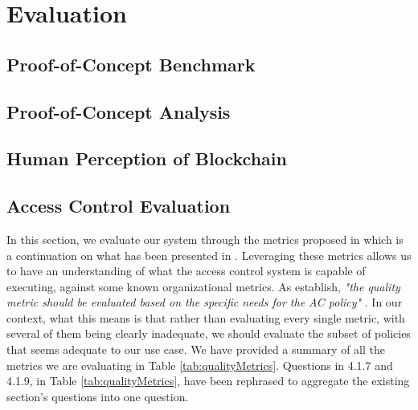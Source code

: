 \chapter{Evaluation}
\label{chap:evaluation}

\section{Proof-of-Concept Benchmark}
\label{sec:eval-benchmark}

\section{Proof-of-Concept Analysis}

\section{Human Perception of Blockchain}

\section{Access Control Evaluation}

In this section, we evaluate our system through the metrics proposed in \cite{hu_guidelines_2012} which is a continuation on what has been presented in \cite{hu_assessment_2006}. Leveraging these metrics allows us to have an understanding of what the access control system is capable of executing, against some known organizational metrics. As \citeauthor{hu_guidelines_2012} \cite{hu_guidelines_2012} establish, \emph{"the quality metric should be evaluated based on the specific needs for the AC policy"} \cite[25]{hu_guidelines_2012}. In our context, what this means is that rather than evaluating every single metric, with several of them being clearly inadequate, we should evaluate the subset of policies that seems adequate to our use case. We have provided a summary of all the metrics we are evaluating in Table \ref{tab:qualityMetrics}. Questions in 4.1.7 and 4.1.9, in Table \ref{tab:qualityMetrics}, have been rephrased to aggregate the existing section's questions into one question.

